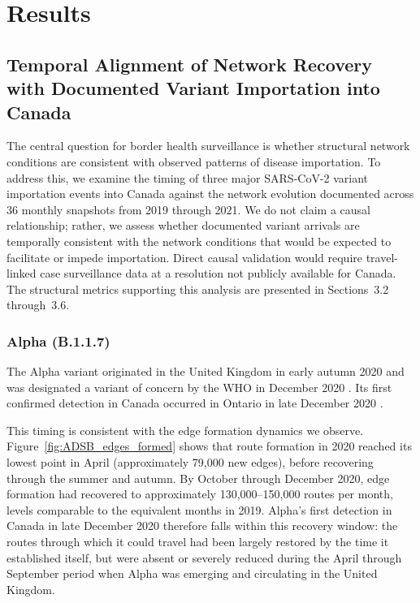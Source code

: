 \documentclass{elsarticle}
\begin{document}
\section{Results}

\subsection{Temporal Alignment of Network Recovery with Documented Variant Importation into Canada}\label{subsec:variant_alignment}


The central question for border health surveillance is whether structural network conditions are consistent with observed patterns of disease importation. To address this, we examine the timing of three major SARS-CoV-2 variant importation events into Canada against the network evolution documented across 36 monthly snapshots from 2019 through 2021. We do not claim a causal relationship; rather, we assess whether documented variant arrivals are temporally consistent with the network conditions that would be expected to facilitate or impede importation. Direct causal validation would require travel-linked case surveillance data at a resolution not publicly available for Canada. The structural metrics supporting this analysis are presented in Sections~3.2 through~3.6.

\subsubsection*{Alpha (B.1.1.7)}

The Alpha variant originated in the United Kingdom in early autumn 2020 and was designated a variant of concern by the WHO in December 2020 \cite{rambaut2020preliminary}. Its first confirmed detection in Canada occurred in Ontario in late December 2020 \cite{alpha_canada_2020}.

This timing is consistent with the edge formation dynamics we observe. Figure~\ref{fig:ADSB_edges_formed} shows that route formation in 2020 reached its lowest point in April (approximately 79,000 new edges), before recovering through the summer and autumn. By October through December 2020, edge formation had recovered to approximately 130,000--150,000 routes per month, levels comparable to the equivalent months in 2019. Alpha's first detection in Canada in late December 2020 therefore falls within this recovery window: the routes through which it could travel had been largely restored by the time it established itself, but were absent or severely reduced during the April through September period when Alpha was emerging and circulating in the United Kingdom.
\end{document}

